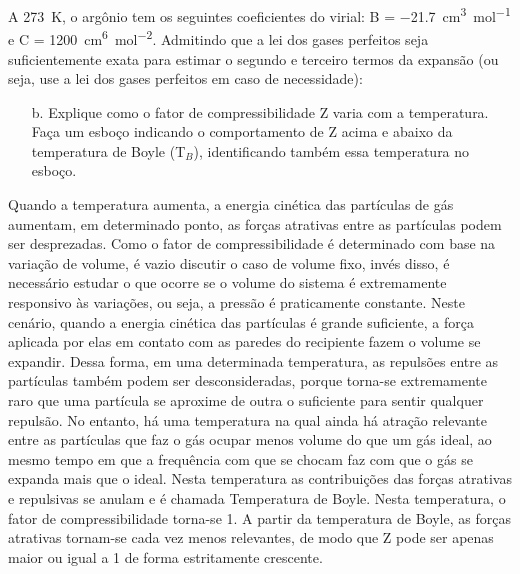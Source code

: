 \begin{xcs}
    A \qty{273}{K}, o argônio tem os seguintes coeficientes do virial: 
    B = \qty{-21,7}{cm^3 mol^{-1}} e C = \qty{1200}{cm^6 mol^{-2}}.
    Admitindo que a lei dos gases perfeitos seja
    suficientemente exata para estimar o segundo e terceiro termos da expansão
    (ou seja, use a lei dos gases perfeitos em caso de necessidade): 
    \begin{enumerate}[label=\alph*.]
        \item[b.] Explique como o fator de compressibilidade Z varia com a
            temperatura. Faça um esboço indicando o comportamento de Z acima e
            abaixo da temperatura de Boyle (T\(_B\)), identificando também essa
            temperatura no esboço. 
    \end{enumerate}
\end{xcs}
\begin{rsl}
    Quando a temperatura aumenta, a energia cinética das partículas de gás aumentam, em determinado ponto, as forças atrativas entre as partículas podem ser desprezadas. Como o fator de compressibilidade é determinado com base na variação de volume, é vazio discutir o caso de volume fixo, invés disso, é necessário estudar o que ocorre se o volume do sistema é extremamente responsivo às variações, ou seja, a pressão é praticamente constante. Neste cenário, quando a energia cinética das partículas é grande suficiente, a força aplicada por elas em contato com as paredes do recipiente fazem o volume se expandir. Dessa forma, em uma determinada temperatura, as repulsões entre as partículas também podem ser desconsideradas, porque torna-se extremamente raro que uma partícula se aproxime de outra o suficiente para sentir qualquer repulsão. No entanto, há uma temperatura na qual ainda há atração relevante entre as partículas que faz o gás ocupar menos volume do que um gás ideal, ao mesmo tempo em que a frequência com que se chocam faz com que o gás se expanda mais que o ideal. Nesta temperatura as contribuições das forças atrativas e repulsivas se anulam e é chamada Temperatura de Boyle. Nesta temperatura, o fator de compressibilidade torna-se 1. A partir da temperatura de Boyle, as forças atrativas tornam-se cada vez menos relevantes, de modo que Z pode ser apenas maior ou igual a 1 de forma estritamente crescente.
\end{rsl}
